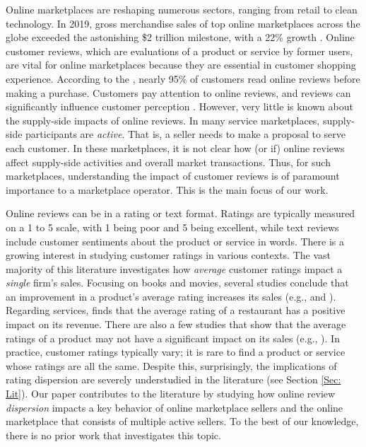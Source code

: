 \documentclass[mnsc,blindrev]{informs3}
\begin{document}
	
	Online marketplaces are reshaping numerous sectors, ranging from retail to clean technology. In 2019, gross merchandise sales of top online marketplaces across the globe exceeded the astonishing \$2 trillion milestone, with a 22\% growth \citep{onlinemarket}. Online customer reviews, which are evaluations of a product or service by former users, are vital for online marketplaces because they are essential in customer shopping experience. According to the \cite{Northwestern}, nearly 95\% of customers read online reviews before making a purchase.
	Customers pay attention to online reviews, and reviews can significantly influence customer perception \citep{askalidis2016value,reviewmatter}. However, very little is known about the supply-side impacts of online reviews. In many service marketplaces, supply-side participants are \emph{active}. That is, a seller needs to make a proposal to serve each customer. In these marketplaces, it is not clear how (or if) online reviews affect supply-side activities and overall market transactions. Thus, for such marketplaces, understanding the impact of customer reviews is of paramount importance to a marketplace operator. This is the main focus of our work.
	
	
	Online reviews can be in a rating or text format. Ratings are typically measured on a 1 to 5 scale, with 1 being poor and 5 being excellent, while text reviews include customer sentiments about the product or service in words.  There is a growing interest in studying customer ratings in various contexts. The vast majority of this literature investigates how \emph{average} customer ratings impact a \emph{single} firm's sales. Focusing on books and movies, several studies conclude that an improvement in a product's average rating increases its sales (e.g., \cite{chintagunta2010effects} and \cite{chevalier2006effect}). Regarding services, \cite{luca2016reviews} finds that the average rating of a restaurant has a positive impact on its revenue. There are also a few studies that show that the average ratings of a product may not have a significant impact on its sales (e.g., \cite{duan2008online}).  In practice, customer ratings typically vary; it is rare to find a product or service whose ratings are all the same. Despite this, surprisingly, the implications of rating dispersion are severely understudied in the literature (see Section \ref{Sec: Lit}). Our paper contributes to the literature by studying how online review \emph{dispersion} impacts  a key behavior of online marketplace sellers and the online marketplace that consists of multiple active sellers. To the best of our knowledge, there is no prior work that investigates this topic.
	
\end{document}
